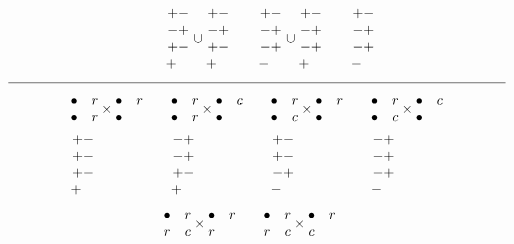 \documentclass[11pt ,reqno]{amsart}
\begin{document}
\begin{example}
$$\begin{aligned}
&&\quad
\mat +-\\-+\\+-\\{+}\quad\emat\cup\mat +-\\-+\\+-\\ {+}\quad\emat
&&\quad
\mat +-\\-+\\-+\\{-}\quad\emat\cup\mat +-\\-+\\-+\\ {+}\quad\emat
&&\quad
\mat +-\\-+\\-+\\ {-}\quad\emat
\end{aligned}
$$
$\line(1,0){360}$
$$
\begin{aligned}
  &\mat \bullet &r\\\bullet&r\emat \times\mat\bullet &r\\\bullet& \emat
  &&\quad\mat \bullet&r\\\bullet&r\emat \times\mat\bullet& c\\\bullet&\emat
  &&\quad\mat \bullet&r\\\bullet &c\emat\times\mat\bullet& r\\\bullet&\emat
  &&\quad\mat \bullet&r\\\bullet&c\emat \times\mat\bullet&c\\\bullet&\emat\\
&\mat +-\\+-\\+-\\ {+}\quad\emat
&&\quad
\mat -+\\-+\\+-\\ {+}\quad\emat
&&\quad
\mat +-\\+-\\-+\\ {-}\quad\emat
&&\quad
\mat -+\\-+\\-+\\ {-}\quad\emat
\end{aligned}
$$
$$
  \begin{aligned}
&\mat \bullet &r\\r&c\emat \times\mat\bullet &r\\{r}& \emat
&&\quad\mat \bullet&r\\r&c\emat \times\mat\bullet& r\\{c}&\emat

\end{aligned}$$
\end{example}
\end{document}
